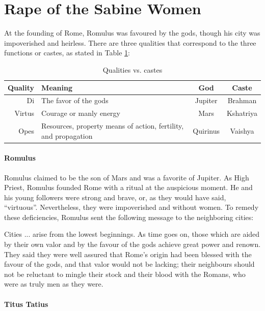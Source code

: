 \section{Rape of the Sabine Women}

At the founding of Rome, Romulus was favoured by the gods, though his city was impoverished and heirless. There are three qualities that correspond to the three functions or castes, as stated in Table \ref{tab:QualitiesCastes}:

\begin{table}[h]\centering\small
\begin{tabular}{rp{}cc}\toprule
\textbf{Quality} & \textbf{Meaning} & \textbf{God} & \textbf{Caste} \\\midrule
Di & The favor of the gods & Jupiter & Brahman \\ Virtus & Courage or manly energy & Mars & Kshatriya \\ Opes & Resources, property means of action, fertility, and propagation & Quirinus & Vaishya \\\bottomrule
\end{tabular}
\caption{Qualities vs. castes}
\label{tab:QualitiesCastes}
\end{table}

\paragraph{Romulus}


Romulus claimed to be the son of Mars and was a favorite of Jupiter. As High Priest, Romulus founded Rome with a ritual at the auspicious moment. He and his young followers were strong and brave, or, as they would have said, ``virtuous''. Nevertheless, they were impoverished and without women. To remedy these deficiencies, Romulus sent the following message to the neighboring cities:

\begin{quotex}
Cities ... arise from the lowest beginnings. As time goes on, those which are aided by their own valor and by the favour of the gods achieve great power and renown. They said they were well assured that Rome's origin had been blessed with the favour of the gods, and that valor would not be lacking; their neighbours should not be reluctant to mingle their stock and their blood with the Romans, who were as truly men as they were.
\end{quotex}


\paragraph{Titus Tatius}


